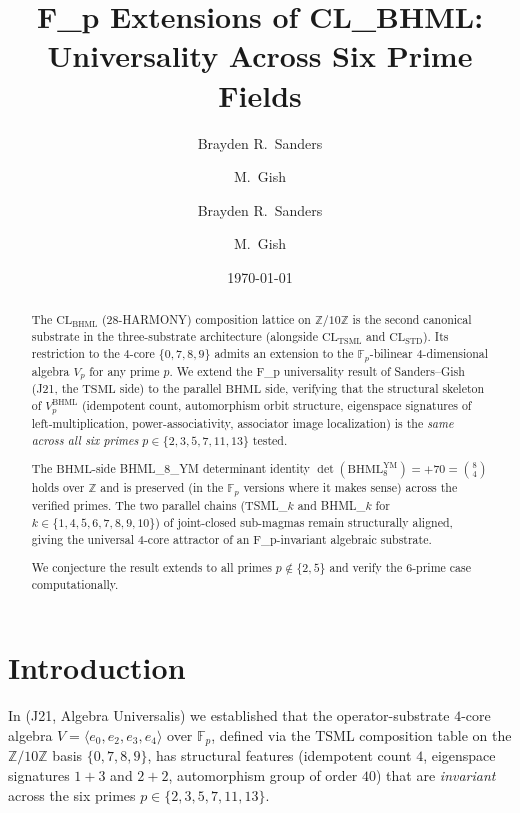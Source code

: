 \documentclass[11pt,reqno]{amsart}
\title[F_p Extensions of CL_BHML]
{F_p Extensions of CL\_BHML: Universality Across Six Prime Fields}
\author{Brayden R.\ Sanders \and M.\ Gish}
\author{Brayden R.\ Sanders \and M.\ Gish}
\date{\today}
\theoremstyle{plain}
\theoremstyle{definition}
\theoremstyle{remark}
\newcommand{\Z}{\mathbb{Z}}
\newcommand{\F}{\mathbb{F}}
\newcommand{\TSML}{\mathrm{TSML}}
\newcommand{\BHML}{\mathrm{BHML}}
\begin{document}
\begin{abstract}
The $\mathrm{CL}_\BHML$ ($28$-HARMONY) composition lattice on
$\Z/10\Z$ is the second canonical substrate in the three-substrate
architecture (alongside $\mathrm{CL}_\TSML$ and $\mathrm{CL}_\mathrm{STD}$).
Its restriction to the $4$-core $\{0,7,8,9\}$ admits an extension to
the $\F_p$-bilinear $4$-dimensional algebra $V_p$ for any prime $p$.
We extend the F_p universality result of Sanders--Gish
\cite{SandersGishFpTSML} (J21, the $\TSML$ side) to the parallel
$\BHML$ side, verifying that the structural skeleton of $V_p^\BHML$
(idempotent count, automorphism orbit structure, eigenspace
signatures of left-multiplication, power-associativity, associator
image localization) is the \emph{same across all six primes}
$p \in \{2, 3, 5, 7, 11, 13\}$ tested.

The $\BHML$-side BHML\_8\_YM determinant identity
$\det(\BHML_8^{\text{YM}}) = +70 = \binom{8}{4}$ holds over $\Z$ and
is preserved (in the $\F_p$ versions where it makes sense) across the
verified primes. The two parallel chains (TSML\_$k$ and BHML\_$k$ for
$k \in \{1, 4, 5, 6, 7, 8, 9, 10\}$) of joint-closed sub-magmas
remain structurally aligned, giving the universal $4$-core attractor
of \cite{SandersGishFourCore} an F_p-invariant algebraic substrate.

We conjecture the result extends to all primes $p \notin \{2, 5\}$ and
verify the $6$-prime case computationally.
\end{abstract}

\maketitle

\tableofcontents

\section{Introduction}

In \cite{SandersGishFpTSML} (J21, Algebra Universalis) we established
that the operator-substrate $4$-core algebra
$V = \langle e_0, e_2, e_3, e_4 \rangle$ over $\F_p$, defined via the
$\TSML$ composition table on the $\Z/10\Z$ basis $\{0, 7, 8, 9\}$,
has structural features (idempotent count $4$, eigenspace signatures
$1{+}3$ and $2{+}2$, automorphism group of order $40$) that are
\emph{invariant} across the six primes $p \in \{2,3,5,7,11,13\}$.
\end{document}
